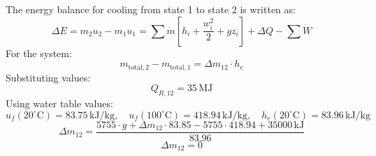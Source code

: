 The energy balance for cooling from state 1 to state 2 is written as:  
\[
\Delta E = m_2 u_2 - m_1 u_1 = \sum \dot{m} \left[ h_i + \frac{w_i^2}{2} + g z_i \right] + \Delta Q - \sum \dot{W}
\]  
For the system:  
\[
m_{\text{total},2} - m_{\text{total},1} = \Delta m_{12} \cdot h_e
\]  
Substituting values:  
\[
Q_{R,12} = 35 \, \text{MJ}
\]  
Using water table values:  
\[
u_f (20^\circ\text{C}) = 83.75 \, \text{kJ/kg}, \quad u_f (100^\circ\text{C}) = 418.94 \, \text{kJ/kg}, \quad h_e (20^\circ\text{C}) = 83.96 \, \text{kJ/kg}
\]  
\[
\Delta m_{12} = \frac{5755 \cdot g + \Delta m_{12} \cdot 83.85 - 5755 \cdot 418.94 + 35000 \, \text{kJ}}{83.96}
\]  
\[
\Delta m_{12} = 0
\]
